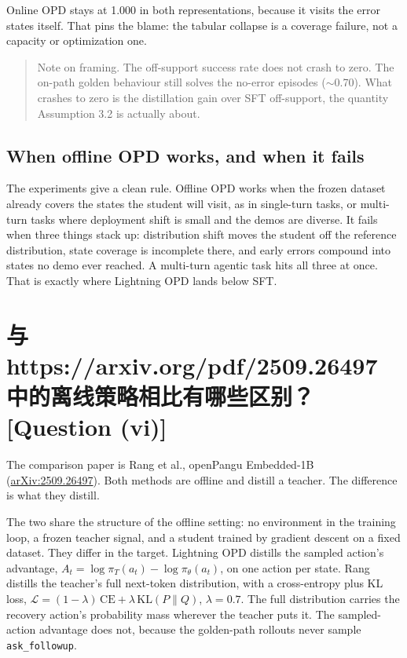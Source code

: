 \documentclass[11pt]{article}
\newcommand{\code}[1]{\texttt{#1}}
\newcommand{\qtag}[1]{\hfill{\normalfont\small\color{gray}[Question (#1)]}}
\begin{document}
Online OPD stays at 1.000 in both representations, because it visits the
error states itself. That pins the blame: the tabular collapse is a coverage
failure, not a capacity or optimization one.

\begin{quote}\small
Note on framing. The off-support success rate does not crash to zero. The
on-path golden behaviour still solves the no-error episodes ($\sim$0.70). What
crashes to zero is the distillation gain over SFT off-support, the
quantity Assumption 3.2 is actually about.
\end{quote}

\subsection{When offline OPD works, and when it fails}

The experiments give a clean rule. Offline OPD works when the frozen
dataset already covers the states the student will visit, as in single-turn tasks, or
multi-turn tasks where deployment shift is small and the demos are diverse.
It fails when three things stack up: distribution shift moves the student
off the reference distribution, state coverage is incomplete there, and early
errors compound into states no demo ever reached. A multi-turn agentic task hits
all three at once. That is exactly where Lightning OPD lands below SFT.

\section{与 https://arxiv.org/pdf/2509.26497 中的离线策略相比有哪些区别？ \qtag{vi}}
\label{sec:rang}

The comparison paper is Rang et al., openPangu Embedded-1B
(\href{https://arxiv.org/pdf/2509.26497}{arXiv:2509.26497}). Both methods are
offline and distill a teacher. The difference is what they distill.

The two share the structure of the offline setting: no environment in the training
loop, a frozen teacher signal, and a student trained by gradient descent on a fixed
dataset. They differ in the target. Lightning OPD distills the sampled action's
advantage, $A_t = \log\pi_T(a_t) - \log\pi_\theta(a_t)$, on one action per state.
Rang distills the teacher's full next-token distribution, with a cross-entropy plus
KL loss, $\mathcal{L} = (1-\lambda)\,\mathrm{CE} + \lambda\,\mathrm{KL}(P\|Q)$,
$\lambda=0.7$. The full distribution carries the recovery action's probability mass
wherever the teacher puts it. The sampled-action advantage does not, because the
golden-path rollouts never sample \code{ask\_followup}.
\end{document}
